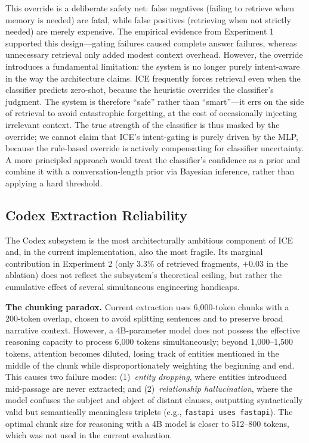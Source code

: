 \documentclass[10pt]{article}
\begin{document}
This override is a deliberate safety net: false negatives (failing to retrieve when memory is needed) are fatal, while false positives (retrieving when not strictly needed) are merely expensive. The empirical evidence from Experiment 1 supported this design---gating failures caused complete answer failures, whereas unnecessary retrieval only added modest context overhead. However, the override introduces a fundamental limitation: the system is no longer purely intent-aware in the way the architecture claims. ICE frequently forces retrieval even when the classifier predicts zero-shot, because the heuristic overrides the classifier's judgment. The system is therefore ``safe'' rather than ``smart''---it errs on the side of retrieval to avoid catastrophic forgetting, at the cost of occasionally injecting irrelevant context. The true strength of the classifier is thus masked by the override; we cannot claim that ICE's intent-gating is purely driven by the MLP, because the rule-based override is actively compensating for classifier uncertainty. A more principled approach would treat the classifier's confidence as a prior and combine it with a conversation-length prior via Bayesian inference, rather than applying a hard threshold.

\subsection{Codex Extraction Reliability}
The Codex subsystem is the most architecturally ambitious component of ICE and, in the current implementation, also the most fragile. Its marginal contribution in Experiment 2 (only 3.3\% of retrieved fragments, $+0.03$ in the ablation) does not reflect the subsystem's theoretical ceiling, but rather the cumulative effect of several simultaneous engineering handicaps.

\textbf{The chunking paradox.} Current extraction uses 6{,}000-token chunks with a 200-token overlap, chosen to avoid splitting sentences and to preserve broad narrative context. However, a 4B-parameter model does not possess the effective reasoning capacity to process 6{,}000 tokens simultaneously; beyond 1{,}000--1{,}500 tokens, attention becomes diluted, losing track of entities mentioned in the middle of the chunk while disproportionately weighting the beginning and end. This causes two failure modes: (1)~\emph{entity dropping}, where entities introduced mid-passage are never extracted; and (2)~\emph{relationship hallucination}, where the model confuses the subject and object of distant clauses, outputting syntactically valid but semantically meaningless triplets (e.g., \texttt{fastapi uses fastapi}). The optimal chunk size for reasoning with a 4B model is closer to 512--800 tokens, which was not used in the current evaluation.
\end{document}
